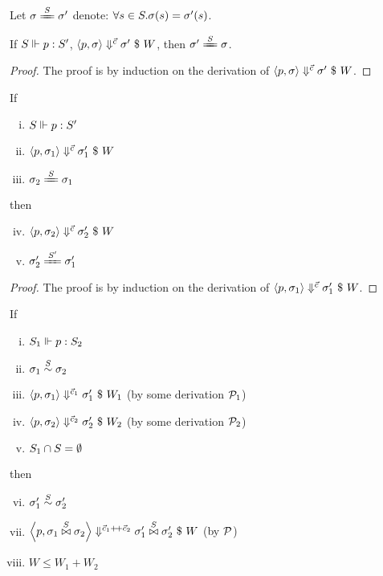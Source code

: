 \begin{nota}
	Let $\sgm \ConEq{\S} \sgm'$ denote: $\forall s \in \S. \sgm(s) = \sgm'(s)$.
\end{nota}

\begin{lem}\label{lem-}
	If $\wf{p}{\S}{\S'}$, $\seval{p}{\sgm}{\c}{\sgm'}{W}$, then $\sgm' \ConEq{\S} \sgm$.
\end{lem}
\begin{proof}
	The proof is by induction on the derivation of $\seval{p}{\sgm}{\c}{\sgm'}{W}$.
\end{proof}


\begin{lem} \label{lem-emp-join}
	If 
	\begin{enumerate} [(i)]
		\item $\wf{p}{\S}{\S'}$
		\item $\seval{p}{\sgm_1}{\c}{\sgm_1'}{W}$
		\item $\sgm_2 \ConEq{S} \sgm_1$
	\end{enumerate}
	then 
	\begin{enumerate}[(i)]
		\setcounter{enumi}{3}
		\item $\seval{p}{\sgm_2}{\c}{\sgm_2'}{W}$
		\item $\sgm_2' \ConEq{\S'} \sgm_1'$
	\end{enumerate}
\end{lem}
\begin{proof}
	The proof is by induction on the derivation of $\seval{p}{\sgm_1}{\c}{\sgm_1'}{W}$.
\end{proof}


\begin{lem}  \label{lem-sgm-join}
	If 
	\begin{enumerate}[(i)]
		\item $\wf{p}{\S_1}{\S_2}$
		\item $\sgm_1 \~{\S} \sgm_2$
		\item $\seval{p}{\sgm_1}{\c_1}{\sgm_1'}{W_1}$ (by some derivation $\MP_1$)
		\item $	\seval{p}{\sgm_2} {\c_2} {\sgm_2'}{W_2}$ (by some derivation $\MP_2$)
		\item $\S_1 \cap \S = \emptyset $
	\end{enumerate}
	then 
	\begin{enumerate}[(i)]
		\setcounter{enumi}{5}
		\item $\sgm_1' \~\S \sgm_2'$
		\item $\seval{p}{\sgm_1 \x\S \sgm_2}{\c_1 {\++} \c_2}{ \sgm_1' \x\S \sgm_2' }{W}$ (by $\MP$)
		\item $W \le W_1 + W_2$
	\end{enumerate}
\end{lem}

